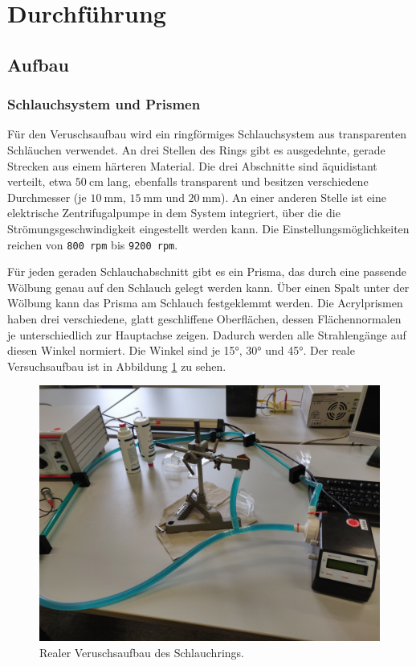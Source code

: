 \section{Durchführung}
\label{sec:Durchführung}

\subsection{Aufbau}
\subsubsection{Schlauchsystem und Prismen}
Für den Veruschsaufbau wird ein ringförmiges Schlauchsystem aus transparenten Schläuchen verwendet. An drei Stellen des Rings gibt es ausgedehnte, gerade Strecken aus einem härteren
Material. Die drei Abschnitte sind äquidistant verteilt, etwa $\SI{50}{\centi\meter}$ lang, ebenfalls transparent und besitzen verschiedene Durchmesser (je $\SI{10}{\milli\meter}$, 
$\SI{15}{\milli\meter}$ und $\SI{20}{\milli\meter}$). An einer anderen Stelle ist eine elektrische Zentrifugalpumpe in dem System integriert, über die die Strömungsgeschwindigkeit
eingestellt werden kann. Die Einstellungsmöglichkeiten reichen von \texttt{800 rpm} bis \texttt{9200 rpm}.

Für jeden geraden Schlauchabschnitt gibt es ein Prisma, das durch eine passende Wölbung genau auf den Schlauch gelegt werden kann. Über einen Spalt unter der Wölbung kann das Prisma
am Schlauch festgeklemmt werden. Die Acrylprismen haben drei verschiedene, glatt geschliffene Oberflächen, dessen Flächennormalen je unterschiedlich zur Hauptachse zeigen.
Dadurch werden alle Strahlengänge auf diesen Winkel normiert. Die Winkel sind je 15°, 30° und 45°.
Der reale Versuchsaufbau ist in Abbildung \ref{fig:real} zu sehen.

\begin{figure}
    \centering
    \includegraphics[width=.8\textwidth]{media/Schlauchsystem.jpg}
    \caption{Realer Veruschsaufbau des Schlauchrings.}
    \label{fig:real}
\end{figure}

